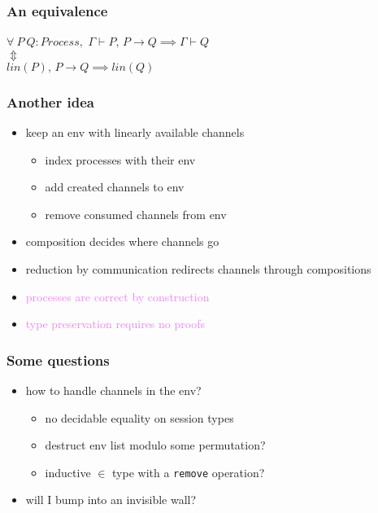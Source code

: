\documentclass{beamer}
\begin{document}
\begin{frame}
    \frametitle{An equivalence}
    \LARGE
    \centering
    $\forall \ P \ Q : Process,$ 
    \vfill
    $\Gamma \vdash P, \,P \rightarrow Q \implies \Gamma \vdash Q$ \\
    $\Updownarrow$ \\
    $lin(P), \, P \rightarrow Q \implies lin(Q)$ \\
\end{frame}

\begin{frame}
    \frametitle{Another idea}
    \begin{itemize}
        \item keep an env with linearly available channels
        \begin{itemize}
            \item index processes with their env
            \item add created channels to env
            \item remove consumed channels from env
        \end{itemize}
        \item composition decides where channels go
        \item reduction by communication redirects channels through compositions
        \item \textcolor{violet}{processes are correct by construction}
        \item \textcolor{violet}{type preservation requires no proofs}
    \end{itemize}
\end{frame}

\begin{frame}
    \frametitle{Some questions}
    \begin{itemize}
        \item how to handle channels in the env?
        \begin{itemize}
            \item no decidable equality on session types
            \item destruct env list modulo some permutation?
            \item inductive $\in$ type with a \texttt{remove} operation?
        \end{itemize}
        \item will I bump into an invisible wall?
    \end{itemize}
\end{frame}
\end{document}
